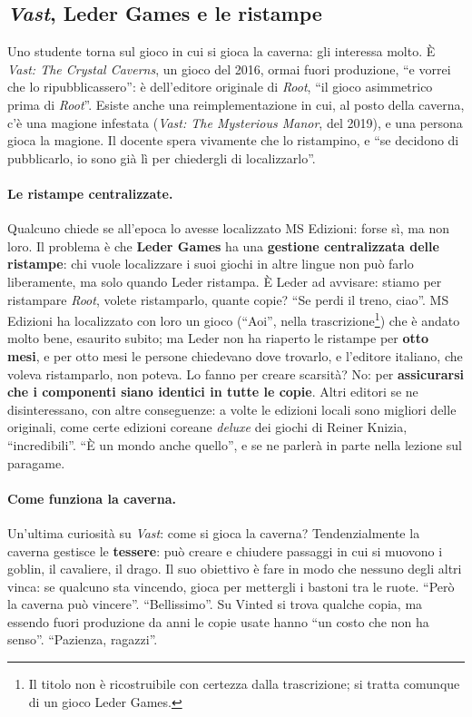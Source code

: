 \subsection{\emph{Vast}, Leder Games e le ristampe}

Uno studente torna sul gioco in cui si gioca la caverna: gli interessa molto. È
\emph{Vast: The Crystal Caverns}, un gioco del 2016, ormai fuori produzione, ``e vorrei
che lo ripubblicassero'': è dell'editore originale di \emph{Root}, ``il gioco
asimmetrico prima di \emph{Root}''. Esiste anche una reimplementazione in cui, al
posto della caverna, c'è una magione infestata (\emph{Vast: The Mysterious Manor},
del 2019), e una persona gioca la magione. Il docente spera vivamente che lo
ristampino, e ``se decidono di pubblicarlo, io sono già lì per chiedergli di
localizzarlo''.

\paragraph{Le ristampe centralizzate.} Qualcuno chiede se all'epoca lo avesse
localizzato MS Edizioni: forse sì, ma non loro. Il problema è che \textbf{Leder Games}
ha una \textbf{gestione centralizzata delle ristampe}: chi vuole localizzare i suoi
giochi in altre lingue non può farlo liberamente, ma solo quando Leder ristampa. È
Leder ad avvisare: stiamo per ristampare \emph{Root}, volete ristamparlo, quante
copie? ``Se perdi il treno, ciao''. MS Edizioni ha localizzato con loro un gioco
(``Aoi'', nella trascrizione\footnote{Il titolo non è ricostruibile con certezza
dalla trascrizione; si tratta comunque di un gioco Leder Games.}) che è andato
molto bene, esaurito subito; ma Leder non ha riaperto le ristampe per \textbf{otto
mesi}, e per otto mesi le persone chiedevano dove trovarlo, e l'editore italiano,
che voleva ristamparlo, non poteva. Lo fanno per creare scarsità? No: per
\textbf{assicurarsi che i componenti siano identici in tutte le copie}. Altri editori
se ne disinteressano, con altre conseguenze: a volte le edizioni locali sono
migliori delle originali, come certe edizioni coreane \emph{deluxe} dei giochi di
Reiner Knizia, ``incredibili''. ``È un mondo anche quello'', e se ne parlerà in parte
nella lezione sul paragame.

\paragraph{Come funziona la caverna.} Un'ultima curiosità su \emph{Vast}: come si
gioca la caverna? Tendenzialmente la caverna gestisce le \textbf{tessere}: può creare e
chiudere passaggi in cui si muovono i goblin, il cavaliere, il drago. Il suo obiettivo
è fare in modo che nessuno degli altri vinca: se qualcuno sta vincendo, gioca per
mettergli i bastoni tra le ruote. ``Però la caverna può vincere''. ``Bellissimo''. Su
Vinted si trova qualche copia, ma essendo fuori produzione da anni le copie usate
hanno ``un costo che non ha senso''. ``Pazienza, ragazzi''.

